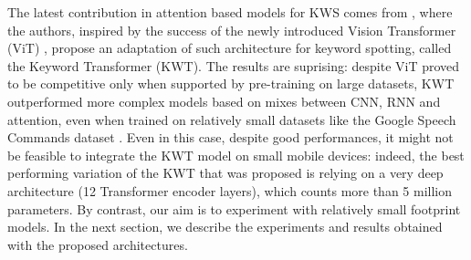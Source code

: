 The latest contribution in attention based models for KWS comes from \cite{kwtransformer2021berg}, where the authors, inspired by the success of the newly introduced Vision Transformer (ViT) \cite{vit2020Dosovitskiy}, propose an adaptation of such architecture for keyword spotting, called the Keyword Transformer (KWT). The results are suprising: despite ViT proved to be competitive only when supported by pre-training on large datasets, KWT outperformed more complex models based on mixes between CNN, RNN and attention, even when trained on relatively small datasets like the Google Speech Commands dataset \cite{speechdataset2018warden}. Even in this case, despite good performances, it might not be feasible to integrate the KWT model on small mobile devices: indeed, the best performing variation of the KWT  that was proposed is relying on a very deep architecture (12 Transformer encoder layers), which counts more than 5 million parameters. By contrast, our aim is to experiment with relatively small footprint models. In the next section, we describe the experiments and results obtained with the proposed architectures.
